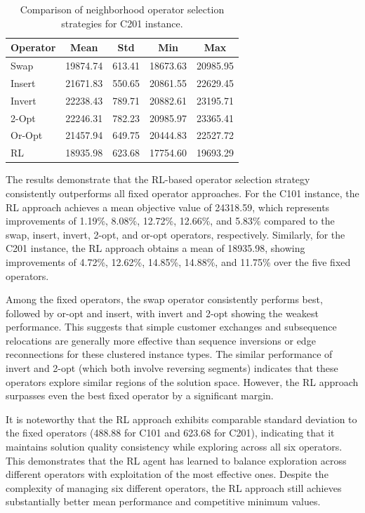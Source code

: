 \begin{table}[ht]
\renewcommand{\arraystretch}{1.3}
\centering
\caption{Comparison of neighborhood operator selection strategies for C201 instance.}
\label{tab:operator_comparison_c201}
\begin{tabular}{l|c|c|c|c}
\hline\hline
Operator & Mean & Std & Min & Max \\
\hline
Swap       & 19874.74 &  613.41 & 18673.63 & 20985.95 \\
Insert     & 21671.83 &  550.65 & 20861.55 & 22629.45 \\
Invert     & 22238.43 &  789.71 & 20882.61 & 23195.71 \\
2-Opt      & 22246.31 &  782.23 & 20985.97 & 23365.41 \\
Or-Opt     & 21457.94 &  649.75 & 20444.83 & 22527.72 \\
RL         & 18935.98 &  623.68 & 17754.60 & 19693.29 \\
\hline\hline
\end{tabular}
\end{table}

The results demonstrate that the RL-based operator selection strategy consistently outperforms all fixed operator approaches. For the C101 instance, the RL approach achieves a mean objective value of 24318.59, which represents improvements of 1.19\%, 8.08\%, 12.72\%, 12.66\%, and 5.83\% compared to the swap, insert, invert, 2-opt, and or-opt operators, respectively. Similarly, for the C201 instance, the RL approach obtains a mean of 18935.98, showing improvements of 4.72\%, 12.62\%, 14.85\%, 14.88\%, and 11.75\% over the five fixed operators.

Among the fixed operators, the swap operator consistently performs best, followed by or-opt and insert, with invert and 2-opt showing the weakest performance. This suggests that simple customer exchanges and subsequence relocations are generally more effective than sequence inversions or edge reconnections for these clustered instance types. The similar performance of invert and 2-opt (which both involve reversing segments) indicates that these operators explore similar regions of the solution space. However, the RL approach surpasses even the best fixed operator by a significant margin.

It is noteworthy that the RL approach exhibits comparable standard deviation to the fixed operators (488.88 for C101 and 623.68 for C201), indicating that it maintains solution quality consistency while exploring across all six operators. This demonstrates that the RL agent has learned to balance exploration across different operators with exploitation of the most effective ones. Despite the complexity of managing six different operators, the RL approach still achieves substantially better mean performance and competitive minimum values.

